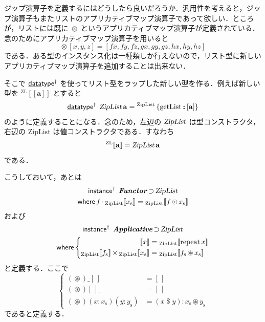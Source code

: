 \documentclass[a5paper,twoside,fleqn,draft]{jsbook}
\def\[{[\![}
\def\]{]\!]}
\newcommand{\mKeyword}[1]{\mathsf{#1}}
\newcommand{\mKeywordUnderline}[1]{\text{\underline{\textsf{#1}}}}
\newcommand{\mDataTypeKeyword}{\mKeywordUnderline{data}\mKeyword{type}}
\newcommand{\mInstanceDeclKeyword}{\mKeyword{instance}}
\newcommand{\mWhereKeyword}{\mKeyword{where}}
\newcommand{\mPolymorphic}[1]{{#1}^\dagger}
\DeclareMathOperator{\mDataTypePolymorphic}{\mDataTypeKeyword^\dagger}
\DeclareMathOperator{\mInstanceDeclPolymorphic}{\mPolymorphic{\mInstanceDeclKeyword}}
\DeclareMathOperator{\mSuperSet}{\supset}
\DeclareMathOperator{\mWhere}{\mWhereKeyword}
\newcommand{\mEmptyList}{{[\,]}}
\newcommand{\mSpecialFunc}[1]{\mathrm{#1}}
\DeclareMathOperator{\mGetList}{\mSpecialFunc{getList}}
\DeclareMathOperator{\mRepeat}{\mSpecialFunc{repeat}}
\DeclareMathOperator{\mApply}{\$}
\DeclareMathOperator{\mAppMap}{\times}
\DeclareMathOperator{\mAppMapList}{\otimes}
\DeclareMathOperator{\mIn}{{:\!:}}
\DeclareMathOperator{\mMap}{\cdot}
\DeclareMathOperator{\mMapList}{\odot}
\DeclareMathOperator{\mZip}{\circledast}
\newcommand{\mType}[1]{\mathbf{#1}} %
\newcommand{\mA}{\mType{a}}
\newcommand{\mTypeAssemble}[2]{{}^\mathrm{#1}\[\mType{#2}\]}
\newcommand{\mZipListType}[1]{\mTypeAssemble{ZL}{#1}}
\newcommand{\mTypeConstructor}[1]{\textsl{#1}}
\DeclareMathOperator{\mZipListTypeConstructor}{\mTypeConstructor{ZipList}}
\newcommand{\mValueConstructor}[1]{\mathrm{#1}}
\newcommand{\mValueWith}[2]{{}_\mValueConstructor{#1}\[#2\]}
\newcommand{\mValueRecordBeginWith}[1]{{}^\mValueConstructor{#1}\,\{}
\newcommand{\mValueRecordEnd}{\}}
\newcommand{\mValueRecordWith}[2]{\mValueRecordBeginWith{#1}{#2}\mValueRecordEnd}
\newcommand{\mZipListWith}[1]{\mValueWith{ZipList}{#1}}
\newcommand{\mPureWith}[1]{\[#1\]}
\newcommand{\mTypeClass}[1]{\textbf{\textit{#1}}}
\newcommand{\mApplicativeTypeClass}{\mTypeClass{Applicative}}
\newcommand{\mFunctorTypeClass}{\mTypeClass{Functor}}
\newcommand{\mList}[1]{{#1}_\mathrm{s}}
\begin{document}
ジップ演算子を定義するにはどうしたら良いだろうか．汎用性を考えると，ジップ演算子もまたリストのアプリカティブマップ演算子であって欲しい．ところが，リストには既に $\mAppMapList$ というアプリカティブマップ演算子が定義されている．念のためにアプリカティブマップ演算子を用いると
\begin{equation}
  [f,g,h]\mAppMapList[x,y,z]
  =[fx,fy,fz,gx,gy,gz,hx,hy,hz]
\end{equation}
である．ある型のインスタンス化は一種類しか行えないので，リスト型に新しいアプリカティブマップ演算子を追加することは出来ない．

そこで $\mDataTypePolymorphic$ を使ってリスト型をラップした新しい型を作る．例えば新しい型を $\mZipListType{a}$ とすると
\begin{equation}
  \label{eq:data-type-ziplist}
  \mDataTypePolymorphic\;
  \mathop{\mZipListTypeConstructor}\mA
  =\mValueRecordWith{ZipList}{\mGetList\mIn{}[\mA]}
\end{equation}
のように定義することになる．念のため，左辺の $\mZipListTypeConstructor$ は型コンストラクタ，右辺の $\mValueConstructor{ZipList}$ は値コンストラクタである．すなわち
\begin{equation}
  \mZipListType{a}
  =\mZipListTypeConstructor\mA
\end{equation}
である．

こうしておいて，あとは
\begin{multline}
  \mInstanceDeclPolymorphic\;
  \mFunctorTypeClass\mSuperSet\mZipListTypeConstructor\\
  \mWhere
  f\mMap{}\mZipListWith{\mList{x}}=\mZipListWith{f\mMapList\mList{x}}
\end{multline}
および
\begin{multline}
  \mInstanceDeclPolymorphic\;
  \mApplicativeTypeClass\mSuperSet\mZipListTypeConstructor\\
  \mWhere
  \left\{
  \begin{aligned}
    \mPureWith{x}
    &=\mZipListWith{\mRepeat x}\\
    \mZipListWith{\mList{f}}\mAppMap\mZipListWith{\mList{x}}
    &=\mZipListWith{\mList{f}\mZip\mList{x}}
  \end{aligned}
  \right.
\end{multline}
と定義する．ここで
\begin{equation}
  \label{eq:zip}
  \left\{
  \begin{aligned}
    (\mZip)\_\mEmptyList&=\mEmptyList\\
    (\mZip)\mEmptyList\_&=\mEmptyList\\
    (\mZip)(x:\mList{x})(y:\mList{y})&=(x\mApply y):\mList{x}\mZip\mList{y}
  \end{aligned}
  \right.
\end{equation}
であると定義する．
\end{document}

